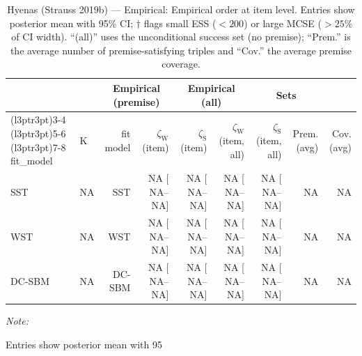 \begin{table}
\centering
\caption{\label{tab:tab:hyenas-strauss-2019b-empirical-emp-item}Hyenas (Strauss 2019b) — Empirical: Empirical order at item level. Entries show posterior mean with 95\% CI; $\dagger$ flags small ESS ($<200$) or large MCSE ($>25\%$ of CI width). “(all)” uses the unconditional success set (no premise); “Prem.” is the average number of premise-satisfying triples and “Cov.” the average premise coverage.}
\centering
\begin{threeparttable}
\begin{tabular}[t]{llrrrrrrr}
\toprule
\multicolumn{2}{c}{ } & \multicolumn{2}{c}{Empirical (premise)} & \multicolumn{2}{c}{Empirical (all)} & \multicolumn{2}{c}{Sets} \\
\cmidrule(l{3pt}r{3pt}){3-4} \cmidrule(l{3pt}r{3pt}){5-6} \cmidrule(l{3pt}r{3pt}){7-8}
fit_model & K & fit model & $\zeta_{\mathrm{W}}$ (item) & $\zeta_{\mathrm{S}}$ (item) & $\zeta_{\mathrm{W}}$ (item, all) & $\zeta_{\mathrm{S}}$ (item, all) & Prem. (avg) & Cov. (avg)\\
\midrule
SST & NA & SST & NA [  NA--  NA] & NA [  NA--  NA] & NA [  NA--  NA] & NA [  NA--  NA] & NA & NA\\
WST & NA & WST & NA [  NA--  NA] & NA [  NA--  NA] & NA [  NA--  NA] & NA [  NA--  NA] & NA & NA\\
DC-SBM & NA & DC-SBM & NA [  NA--  NA] & NA [  NA--  NA] & NA [  NA--  NA] & NA [  NA--  NA] & NA & NA\\
\bottomrule
\end{tabular}
\begin{tablenotes}
\item \textit{Note: } 
\item Entries show posterior mean with 95%
\end{tablenotes}
\end{threeparttable}
\end{table}